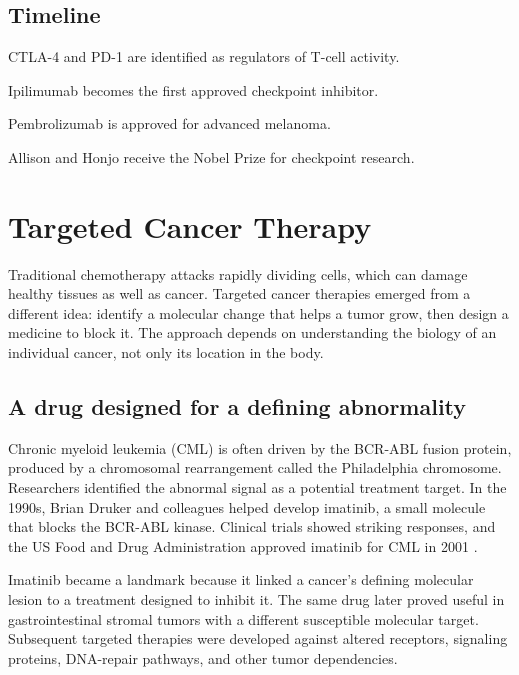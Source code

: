 \documentclass[12pt,oneside]{book}
\begin{document}
\section*{Timeline}
\begin{description}[leftmargin=2.3cm,style=nextline]
  \item[1980s--1990s] CTLA-4 and PD-1 are identified as regulators of T-cell activity.
  \item[2011] Ipilimumab becomes the first approved checkpoint inhibitor.
  \item[2014] Pembrolizumab is approved for advanced melanoma.
  \item[2018] Allison and Honjo receive the Nobel Prize for checkpoint research.
\end{description}
\chapter[Targeted Cancer Therapy]{Targeted Cancer Therapy}

Traditional chemotherapy attacks rapidly dividing cells, which can damage
healthy tissues as well as cancer. Targeted cancer therapies emerged from a
different idea: identify a molecular change that helps a tumor grow, then
design a medicine to block it. The approach depends on understanding the
biology of an individual cancer, not only its location in the body.

\section{A drug designed for a defining abnormality}
Chronic myeloid leukemia (CML) is often driven by the BCR-ABL fusion protein, produced by a chromosomal rearrangement called the Philadelphia chromosome. Researchers identified the abnormal signal as a potential treatment target. In the 1990s, Brian Druker and colleagues helped develop imatinib, a small molecule that blocks the BCR-ABL kinase. Clinical trials showed striking responses, and the US Food and Drug Administration approved imatinib for CML in 2001 \cite{nciGleevec}.

Imatinib became a landmark because it linked a cancer's defining molecular
lesion to a treatment designed to inhibit it. The same drug later proved
useful in gastrointestinal stromal tumors with a different susceptible
molecular target. Subsequent targeted therapies were developed against altered
receptors, signaling proteins, DNA-repair pathways, and other tumor
dependencies.
\end{document}
